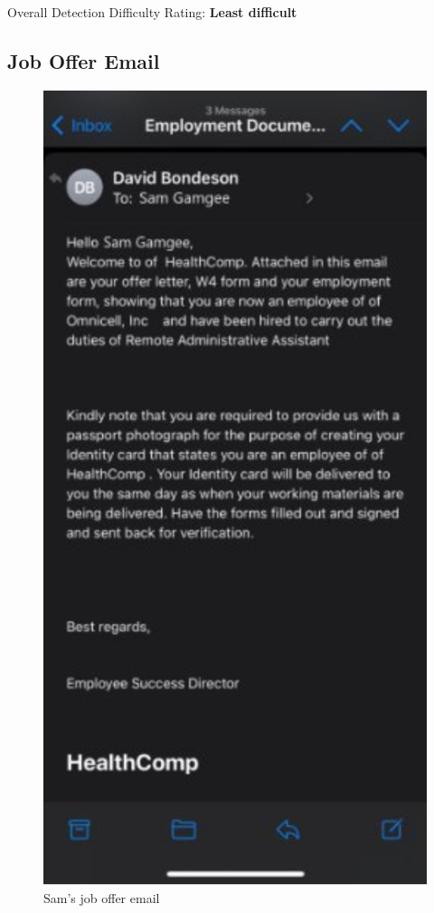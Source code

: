 \begin{fullwidth}
Overall Detection Difficulty Rating: \textbf{Least difficult}

\subsection{Job Offer Email}

\begin{figure}[H] %
    \centering
    \includegraphics{assets/OfferEmail.png}
    \captionsetup{justification=centering}
    \caption{Sam's job offer email}
\end{figure}


\end{fullwidth}
